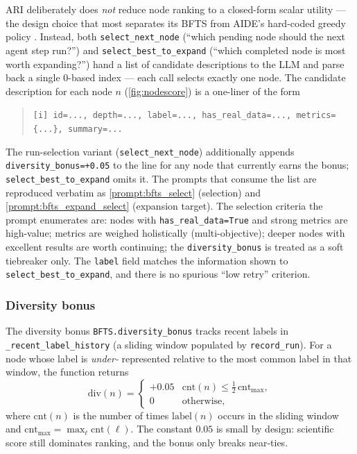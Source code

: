 ARI deliberately does \emph{not} reduce node ranking to a closed-form
scalar utility --- the design choice that most separates its BFTS from
AIDE's hard-coded greedy policy \cite{jiang2025aide}. Instead, both
\texttt{select\_next\_node}
(``which pending node should the next agent step run?'') and
\texttt{select\_best\_to\_expand} (``which completed node is most
worth expanding?'') hand a list of candidate descriptions to the LLM
and parse back a single 0-based index --- each call selects exactly
one node. The candidate description for each node $n$
(\cref{fig:nodescore}) is a one-liner of the form
\begin{quote}\small\texttt{[i] id=..., depth=..., label=..., has\_real\_data=..., metrics=\{...\}, summary=...}\end{quote}
The run-selection variant (\texttt{select\_next\_node}) additionally
appends \texttt{diversity\_bonus=+0.05} to the line for any node that
currently earns the bonus; \texttt{select\_best\_to\_expand} omits it.
The prompts that consume the list are reproduced verbatim as
\cref{prompt:bfts_select} (selection) and \cref{prompt:bfts_expand_select}
(expansion target). The selection criteria the prompt enumerates are:
nodes with \texttt{has\_real\_data=True} and strong metrics are
high-value; metrics are weighed holistically (multi-objective);
deeper nodes with excellent results are worth continuing; the
\texttt{diversity\_bonus} is treated as a soft tiebreaker only.
The \texttt{label} field matches the information shown to
\texttt{select\_best\_to\_expand}, and there is no spurious
``low retry'' criterion.

\subsubsection*{Diversity bonus}\label{sec:exploration:diversity}

The diversity bonus \texttt{BFTS.diversity\_bonus} tracks recent
labels in \texttt{\_recent\_label\_history} (a sliding window populated
by \texttt{record\_run}). For a node whose label is \emph{under-}
represented relative to the most common label in that window, the
function returns
\begin{equation}\label{eq:diversity}
  \mathrm{div}(n) =
    \begin{cases}
      +0.05 & \mathrm{cnt}(n) \le \tfrac{1}{2}\,\mathrm{cnt}_{\max},\\
      0     & \text{otherwise,}
    \end{cases}
\end{equation}
where $\mathrm{cnt}(n)$ is the number of times $\mathrm{label}(n)$
occurs in the sliding window and
$\mathrm{cnt}_{\max}=\max_\ell\mathrm{cnt}(\ell)$.
The constant $0.05$ is small by design: scientific score still
dominates ranking, and the bonus only breaks near-ties.


